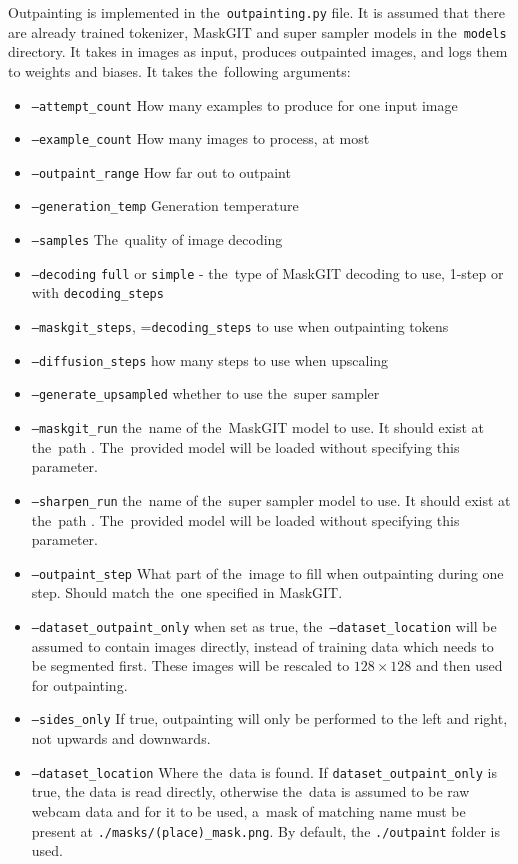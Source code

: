 Outpainting is implemented in the~\texttt{outpainting.py} file. It is assumed that there are already trained tokenizer, MaskGIT and super sampler models in the~\texttt{models} directory. It takes in images as input, produces outpainted images, and logs them to weights and biases. It takes the~following arguments:
\begin{itemize}
    \item \texttt{--attempt\_count} How many examples to produce for one input image
    \item \texttt{--example\_count} How many images to process, at most
    \item \texttt{--outpaint\_range} How far out to outpaint
    \item \texttt{--generation\_temp} Generation temperature
    \item \texttt{--samples} The~quality of image decoding
    \item \texttt{--decoding} \texttt{full} or \texttt{simple} - the~type of MaskGIT decoding to use, 1-step or with \texttt{decoding\_steps}
    \item \texttt{--maskgit\_steps}, =\texttt{decoding\_steps} to use when outpainting tokens
    \item \texttt{--diffusion\_steps} how many steps to use when upscaling
    \item \texttt{--generate\_upsampled} whether to use the~super sampler
    \item \texttt{--maskgit\_run} the~name of the~MaskGIT model to use. It should exist at the~path . The~provided model will be loaded without specifying this parameter.
    \item \texttt{--sharpen\_run} the~name of the~super sampler model to use. It should exist at the~path . The~provided model will be loaded without specifying this parameter.
    \item \texttt{--outpaint\_step} What part of the~image to fill when outpainting during one step. Should match the~one specified in MaskGIT.
    \item \texttt{--dataset\_outpaint\_only} when set as true, the~\texttt{--dataset\_location} will be assumed to contain images directly, instead of training data which needs to be segmented first. These images will be rescaled to $128 \times 128$ and then used for outpainting.
    \item \texttt{--sides\_only} If true, outpainting will only be performed to the left and right, not upwards and downwards.
    \item \texttt{--dataset\_location} Where the~data is found. If \texttt{dataset\_outpaint\_only} is true, the data is read directly, otherwise the~data is assumed to be raw webcam data and for it to be used, a~mask of matching name must be present at \texttt{./masks/(place)\_mask.png}. By default, the \texttt{./outpaint} folder is used.
\end{itemize}




